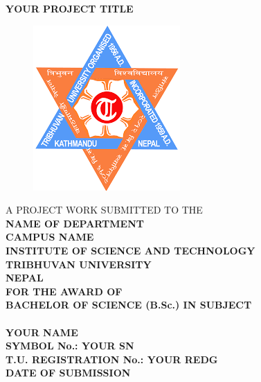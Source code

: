 \begin{titlepage}
\begin{center}
{\fontsize{16}{16}\textbf{YOUR PROJECT TITLE}}
\end{center}
\vspace*{1cm}
\begin{figure}[h]
\begin{center}
\includegraphics[width=0.3\linewidth]{Photos/logo_TU.png}
\end{center}
\end{figure}
\begin{center}
\fontsize{14}{14} {A PROJECT WORK SUBMITTED TO THE}\\ 
\fontsize{14}{14} \textbf{NAME OF DEPARTMENT}\\
{\fontsize{14}{14} \textbf{CAMPUS NAME}}\\
{\fontsize{14}{14} \textbf{INSTITUTE OF SCIENCE AND TECHNOLOGY}}\\
{\fontsize{14}{14} \textbf{TRIBHUVAN UNIVERSITY}}\\
{\fontsize{14}{14} \textbf{NEPAL}}\\
\vspace*{2cm}
\fontsize{14}{14} \textbf{FOR THE AWARD OF}\\ 
\fontsize{14}{14} \textbf{BACHELOR OF SCIENCE (B.Sc.) IN SUBJECT}\\
\vspace*{1cm}
\\
\fontsize{14}{14} \textbf{YOUR NAME}\\
\fontsize{14}{14} \textbf{SYMBOL No.: YOUR SN}\\
\fontsize{14}{14} \textbf{T.U. REGISTRATION No.: YOUR REDG}\\
\vspace*{3cm}
\fontsize{14}{14} \textbf{DATE OF SUBMISSION}
   \end{center}
\end{titlepage}

